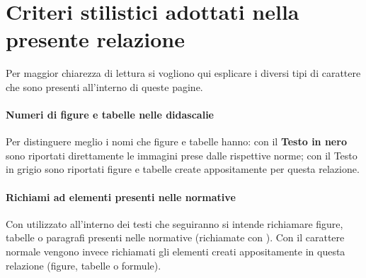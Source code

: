 \section{Criteri stilistici adottati nella presente relazione}
Per maggior chiarezza di lettura si vogliono qui esplicare i diversi tipi di carattere che sono presenti all'interno di queste pagine.
\paragraph*{Numeri di figure e tabelle nelle didascalie} Per distinguere meglio i nomi che figure e tabelle hanno: con il \textbf{Testo in nero} sono riportati direttamente le immagini prese dalle rispettive norme; con il \textcolor{myGray}{Testo in grigio} sono riportati figure e tabelle create appositamente per questa relazione.
\paragraph*{Richiami ad elementi presenti nelle normative} Con  utilizzato all'interno dei testi che seguiranno si intende richiamare figure, tabelle o paragrafi presenti nelle normative (richiamate con ).
Con il carattere normale vengono invece richiamati gli elementi creati appositamente in questa relazione (figure, tabelle o formule).
